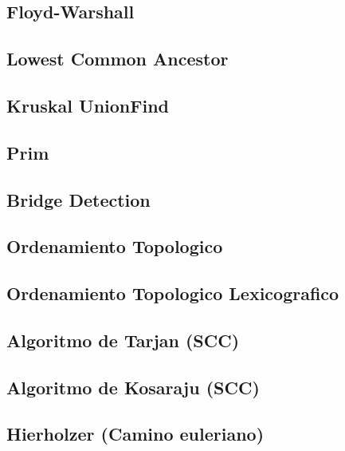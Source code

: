 \subsection{Floyd-Warshall}
\raggedbottom
\hrulefill
\subsection{Lowest Common Ancestor}
\raggedbottom
\hrulefill
\subsection{Kruskal UnionFind}
\raggedbottom
\hrulefill
\subsection{Prim}
\raggedbottom
\hrulefill
\subsection{Bridge Detection}
\raggedbottom
\hrulefill
\subsection{Ordenamiento Topologico}
\raggedbottom
\hrulefill
\subsection{Ordenamiento Topologico Lexicografico}
\raggedbottom
\hrulefill
\subsection{Algoritmo de Tarjan (SCC)}
\raggedbottom
\hrulefill
\subsection{Algoritmo de Kosaraju (SCC)}
\raggedbottom
\hrulefill
\subsection{Hierholzer (Camino euleriano)}
\raggedbottom
\hrulefill
